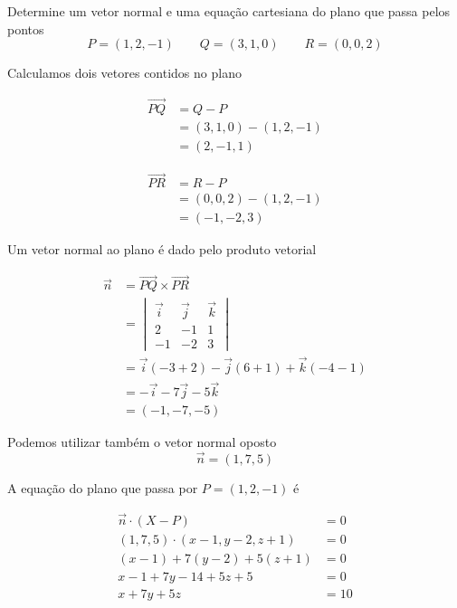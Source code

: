 \documentclass[a4paper,12pt,fleqn]{article}
\begin{document}

Determine um vetor normal e uma equação cartesiana do plano que passa pelos pontos
\[
  P = (1,2,-1)
  \qquad
  Q = (3,1,0)
  \qquad
  R = (0,0,2)
\]

\begin{answer}
  Calculamos dois vetores contidos no plano

  \begin{align*}
    \overrightarrow{PQ}
    & = Q-P
    \\
    & = (3,1,0)-(1,2,-1)
    \\
    & = (2,-1,1)
  \end{align*}

  \begin{align*}
    \overrightarrow{PR}
    & = R-P
    \\
    & = (0,0,2)-(1,2,-1)
    \\
    & = (-1,-2,3)
  \end{align*}

  Um vetor normal ao plano é dado pelo produto vetorial

  \begin{align*}
    \vec{n}
    & = \overrightarrow{PQ}\times\overrightarrow{PR}
    \\
    & = \begin{vmatrix}
          \vec{i} & \vec{j} & \vec{k} \\
          2       & -1      & 1       \\
          -1      & -2      & 3
        \end{vmatrix}
    \\
    & = \vec{i}(-3+2)
      -\vec{j}(6+1)
      +\vec{k}(-4-1)
    \\
    & = -\vec{i}-7\vec{j}-5\vec{k}
    \\
    & = (-1,-7,-5)
  \end{align*}

  Podemos utilizar também o vetor normal oposto
  \[
    \vec{n}=(1,7,5)
  \]

  A equação do plano que passa por $P=(1,2,-1)$ é

  \begin{align*}
    \vec{n}\cdot(X-P)&=0
    \\
    (1,7,5)\cdot(x-1,y-2,z+1)&=0
    \\
    (x-1)+7(y-2)+5(z+1)&=0
    \\
    x-1+7y-14+5z+5&=0
    \\
    x+7y+5z&=10
  \end{align*}
\end{answer}
\end{document}
